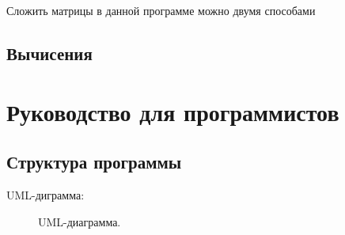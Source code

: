 \documentclass{article}
\numberwithin{equation}{section}
\begin{document}
\qquad Сложить матрицы в данной программе можно двумя способами

\subsection{Вычисения}


\newpage

\section{Руководство для программистов}

\subsection{Структура программы}
UML-диграмма:

\begin{figure}[h]
\caption{UML-диаграмма.}
\label{ris:image}
\end{figure}
\end{document}
